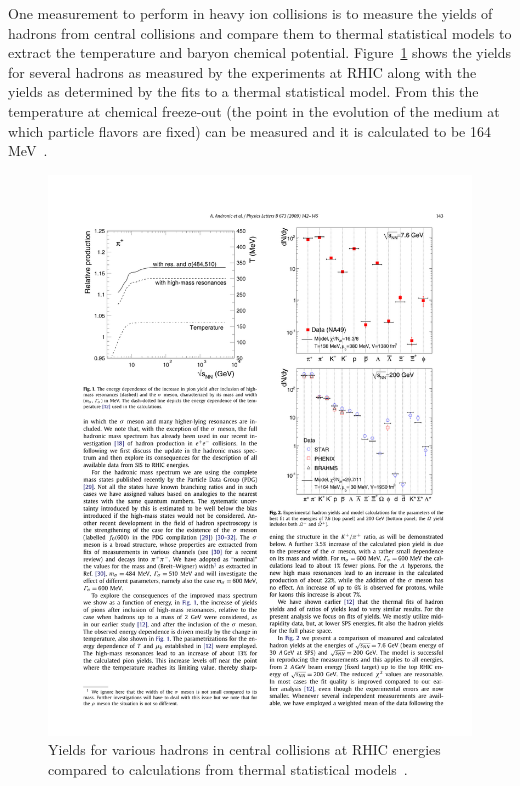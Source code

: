 One measurement to perform in heavy ion collisions is to measure the yields of hadrons from central collisions and compare them to thermal statistical models to extract the temperature and baryon chemical potential. Figure~\ref{fig:hadron_yields} shows the yields for several hadrons as measured by the experiments at RHIC along with the yields as determined by the fits to a thermal statistical model. From this the temperature at chemical freeze-out (the point in the evolution of the medium at which particle flavors are fixed) can be measured and it is calculated to be 164 MeV~\cite{thermstat}.

\begin{figure}[htbp]
\begin{center}
\includegraphics[scale=1.2]{Plots/Intro/had_yields.pdf}
\end{center}
\caption[Hadron Yields]{Yields for various hadrons in central collisions at RHIC energies compared to calculations from thermal statistical models~\cite{thermstat}.}
\label{fig:hadron_yields}
\end{figure}

